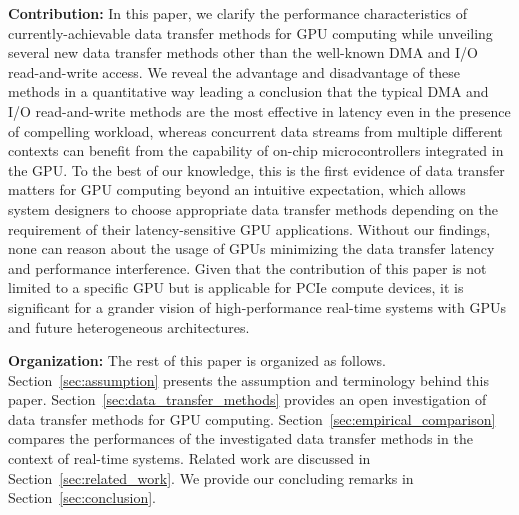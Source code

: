 \textbf{Contribution:}
In this paper, we clarify the performance characteristics of
currently-achievable data transfer methods for GPU computing while
unveiling several new data transfer methods other than the well-known
DMA and I/O read-and-write access.
We reveal the advantage and disadvantage of these methods in a
quantitative way leading a conclusion that the typical DMA and I/O
read-and-write methods are the most effective in latency even in the
presence of compelling workload, whereas concurrent data streams from
multiple different contexts can benefit from the capability of on-chip
microcontrollers integrated in the GPU.
To the best of our knowledge, this is the first evidence of data
transfer matters for GPU computing beyond an intuitive expectation,
which allows system designers to choose appropriate data transfer
methods depending on the requirement of their latency-sensitive GPU
applications.
Without our findings, none can reason about the usage of GPUs minimizing
the data transfer latency and performance interference.
Given that the contribution of this paper is not limited to a specific
GPU but is applicable for PCIe compute devices, it is significant for a
grander vision of high-performance real-time systems with GPUs and
future heterogeneous architectures.

\textbf{Organization:}
The rest of this paper is organized as follows.
Section~\ref{sec:assumption} presents the assumption and terminology
behind this paper.
Section~\ref{sec:data_transfer_methods} provides an open investigation
of data transfer methods for GPU computing.
Section~\ref{sec:empirical_comparison} compares the performances of the
investigated data transfer methods in the context of real-time systems.
Related work are discussed in Section~\ref{sec:related_work}.
We provide our concluding remarks in Section~\ref{sec:conclusion}.
